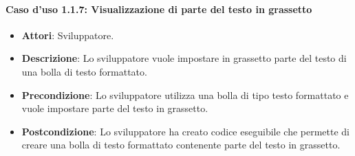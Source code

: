 \paragraph{Caso d'uso 1.1.7: Visualizzazione di parte del testo in grassetto}
\begin{itemize}
\item\textbf{Attori}: Sviluppatore.
\item\textbf{Descrizione}: Lo sviluppatore vuole impostare in grassetto parte del testo di una bolla di testo formattato.
\item\textbf{Precondizione}: Lo sviluppatore utilizza una bolla di tipo testo formattato e vuole impostare parte del testo in grassetto.
\item\textbf{Postcondizione}: Lo sviluppatore ha creato codice eseguibile che permette di creare una bolla di testo formattato contenente parte del testo in grassetto.

\end{itemize}